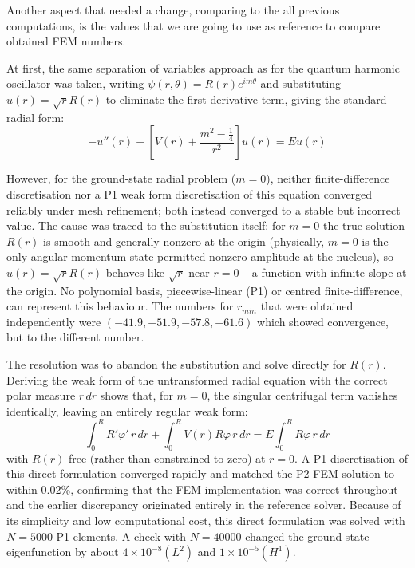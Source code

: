 \documentclass[acmsmall,screen]{MapleTrans}
\begin{document}
Another aspect that needed a change, comparing to the all previous computations, is the values that we are going to use as reference to compare obtained FEM numbers. 

At first, the same separation of variables approach as for the quantum harmonic oscillator was taken, writing $\psi(r, \theta) = R(r)e^{im\theta}$ and substituting $u(r) = \sqrt{r}R(r)$ to eliminate the first derivative term, giving the standard radial form:
\begin{equation}
    -u''(r) + \left[V(r) + \frac{m^2 - \frac{1}{4}}{r^2}\right]u(r) = Eu(r)
\end{equation}

However, for the ground-state radial problem ($m = 0$), neither finite-difference discretisation nor a P1 weak form discretisation of this equation converged reliably under mesh refinement; both instead converged to a stable but incorrect value. The cause was traced to the substitution itself: for $m = 0$ the true solution $R(r)$ is smooth and generally nonzero at the origin (physically, $m = 0$ is the only angular-momentum state permitted nonzero amplitude at the nucleus), so $u(r) = \sqrt{r}R(r)$ behaves like $\sqrt{r}$ near $r = 0$ -- a function with infinite slope at the origin. No polynomial basis, piecewise-linear (P1) or centred finite-difference, can represent this behaviour. The numbers for $r_{min}$ that were obtained independently were $(-41.9, -51.9, -57.8, -61.6)$ which showed convergence, but to the different number.

The resolution was to abandon the substitution and solve directly for $R(r)$. Deriving the weak form of the untransformed radial equation with the correct polar measure $r \, dr$ shows that, for $m = 0$, the singular centrifugal term vanishes identically, leaving an entirely regular weak form:
\begin{equation}
    \int_0^R R'\varphi'\, r\,dr + \int_0^R V(r)R\varphi\, r\,dr = E \int_0^R R\varphi\, r\,dr
\end{equation}
with $R(r)$ free (rather than constrained to zero) at $r = 0$. A P1 discretisation of this direct formulation converged rapidly and matched the P2 FEM solution to within $0.02\%$, confirming that the FEM implementation was correct throughout and the earlier discrepancy originated entirely in the reference solver. Because of its simplicity and low computational cost, this direct formulation was solved with $N = 5000$ P1 elements. A check with $N = 40000$ changed the ground state eigenfunction by about $4 \times 10^{-8} (L^2)$ and $1 \times 10^{-5} (H^1)$.
\end{document}
